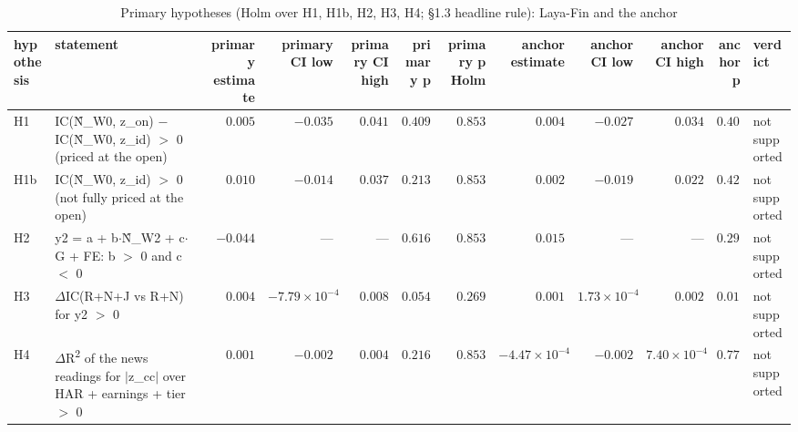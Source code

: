 \begin{table}[tbp]
\centering\small
\caption{Primary hypotheses (Holm over H1, H1b, H2, H3, H4; \S{}1.3 headline rule): Laya-Fin and the anchor}\label{tab:t1_primary}
\begin{adjustbox}{max width=\textwidth}
\begin{tabular}{l>{\raggedright\arraybackslash}p{12em}rrrrrrrrrl}
\toprule
hypothesis & statement & primary estimate & primary CI low & primary CI high & primary p & primary p Holm & anchor estimate & anchor CI low & anchor CI high & anchor p & verdict \\
\midrule
H1 & IC(\^{N}\_\allowbreak{}W0, z\_\allowbreak{}on) $-$ IC(\^{N}\_\allowbreak{}W0, z\_\allowbreak{}id) $>$ 0 (priced at the open) & $0.005$ & $-0.035$ & $0.041$ & $0.409$ & $0.853$ & $0.004$ & $-0.027$ & $0.034$ & $0.406$ & not supported \\
H1b & IC(\^{N}\_\allowbreak{}W0, z\_\allowbreak{}id) $>$ 0 (not fully priced at the open) & $0.010$ & $-0.014$ & $0.037$ & $0.213$ & $0.853$ & $0.002$ & $-0.019$ & $0.022$ & $0.427$ & not supported \\
H2 & y2 = a + b$\cdot$\^{N}\_\allowbreak{}W2 + c$\cdot$G + FE:\allowbreak{} b $>$ 0 and c $<$ 0 & $-0.044$ & --- & --- & $0.616$ & $0.853$ & $0.015$ & --- & --- & $0.294$ & not supported \\
H3 & $\Delta$IC(R+N+J vs R+N) for y2 $>$ 0 & $0.004$ & $-7.79\times 10^{-4}$ & $0.008$ & $0.054$ & $0.269$ & $0.001$ & $1.73\times 10^{-4}$ & $0.002$ & $0.017$ & not supported \\
H4 & $\Delta$R\textsuperscript{2} of the news readings for $|$\allowbreak{}z\_\allowbreak{}cc$|$\allowbreak{} over HAR + earnings + tier $>$ 0 & $0.001$ & $-0.002$ & $0.004$ & $0.216$ & $0.853$ & $-4.47\times 10^{-4}$ & $-0.002$ & $7.40\times 10^{-4}$ & $0.773$ & not supported \\
\bottomrule
\end{tabular}
\end{adjustbox}
\par{}
\end{table}
